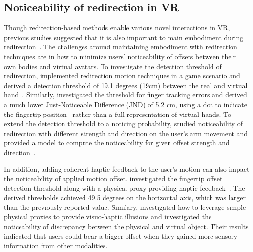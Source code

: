 \subsection{Noticeability of redirection in VR}
Though redirection-based methods enable various novel interactions in VR, previous studies suggested that it is also important to main embodiment during redirection~\cite{wentzel2020improving, zenner2023detectability, zenner2019estimating}.
The challenges around maintaining embodiment with redirection techniques are in how to minimize users' noticeability of offsets between their own bodies and virtual avatars.
To investigate the detection threshold of redirection, \citeauthor{burns2006hand} implemented redirection motion techniques in a game scenario and derived a detection threshold of 19.1 degrees (19cm) between the real and virtual hand~\cite{burns2006hand}.
Similarly, \citeauthor{lee2015enlarging} investigated the threshold for finger tracking errors and derived a much lower Just-Noticeable Difference (JND) of 5.2 cm, using a dot to indicate the fingertip position~\cite{lee2015enlarging} rather than a full representation of virtual hands.
To extend the detection threshold to a noticing probability, \citeauthor{li2022modeling} studied noticeability of redirection with different strength and direction on the user's arm movement and provided a model to compute the noticeability for given offset strength and direction~\cite{li2022modeling}.

In addition, adding coherent haptic feedback to the user's motion can also impact the noticeability of applied motion offset.
\citeauthor{abtahi2018visuo} investigated the fingertip offset detection threshold along with a physical proxy providing haptic feedback~\cite{abtahi2018visuo}.
The derived thresholds achieved 49.5 degrees on the horizontal axis, which was larger than the previously reported value.
Similary, \citeauthor{feick2021visuo} investigated how to leverage simple physical proxies to provide visuo-haptic illusions and investigated the noticeability of discrepancy between the physical and virtual object.
Their results indicated that users could bear a bigger offset when they gained more sensory information from other modalities.

